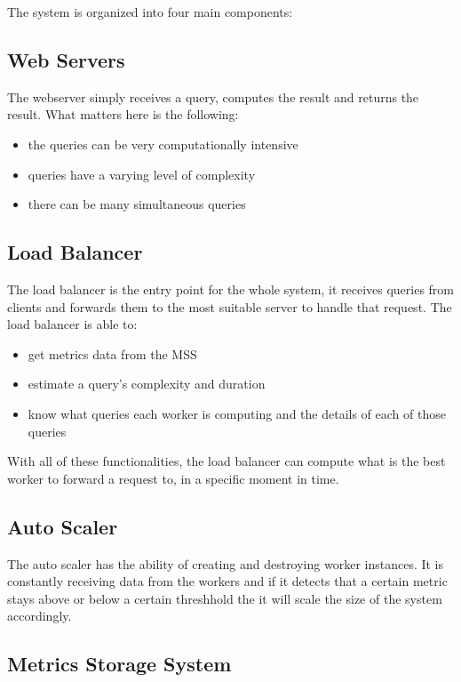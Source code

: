 \documentclass[10pt,twocolumn]{article}
\begin{document}
The system is organized into four main components:

\subsection*{Web Servers}

The webserver simply receives a query, computes the result and returns the result. What matters here is the following:

\begin{itemize}
    \item the queries can be very computationally intensive
    \item queries have a varying level of complexity
    \item there can be many simultaneous queries
\end{itemize}

\subsection*{Load Balancer}

The load balancer is the entry point for the whole system, it receives queries from clients and forwards them to the most suitable server to handle
that request. The load balancer is able to:

\begin{itemize}
    \item get metrics data from the MSS
    \item estimate a query's complexity and duration
    \item know what queries each worker is computing and the details of each of those queries
\end{itemize}

With all of these functionalities, the load balancer can compute what is the best worker to forward a request to, in a specific moment in time.

\subsection*{Auto Scaler}

The auto scaler has the ability of creating and destroying worker instances.
It is constantly receiving data from the workers and if it detects that a certain metric stays above or below a certain threshhold
the it will scale the size of the system accordingly.

\subsection*{Metrics Storage System}
\end{document}
